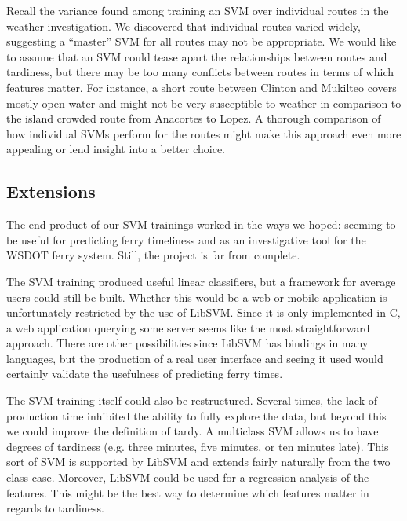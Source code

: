 \documentclass[11pt]{article} %
\begin{document}
Recall the variance found among training an SVM over individual routes in the weather
investigation. We discovered that individual routes varied widely, suggesting a 
``master'' SVM for all routes may not be appropriate. We would like to assume that
an SVM could tease apart the relationships between routes and tardiness, but there
may be too many conflicts between routes in terms of which features matter. For 
instance, a short route between Clinton and Mukilteo covers mostly open water
and might not be very susceptible to weather in comparison to the island crowded
route from Anacortes to Lopez. A thorough comparison of how individual SVMs 
perform for the routes might make this approach even more appealing or lend 
insight into a better choice.


\subsection{Extensions}
\label{sec:extensions}
The end product of our SVM trainings worked in the ways we hoped: seeming to be 
useful for predicting ferry timeliness and as an investigative tool for the
WSDOT ferry system. Still, the project is far from complete. 

The SVM training produced useful linear classifiers, but a framework for average
users could still be built. Whether this would be a web or mobile application is
unfortunately restricted by the use of LibSVM. Since it is only implemented in 
C, a web application querying some server seems like the most straightforward
approach. There are other possibilities since LibSVM has bindings in many languages,
but the production of a real user interface and seeing it used would certainly 
validate the usefulness of predicting ferry times.

The SVM training itself could also be restructured. Several times, the lack of
production time inhibited the ability to fully explore the data, but beyond this
we could improve the definition of tardy. A multiclass SVM allows us to have degrees
of tardiness (e.g. three minutes, five minutes, or ten minutes late). This sort
of SVM is supported by LibSVM and extends fairly naturally from the two class case.
Moreover, LibSVM could be used for a regression analysis of the features. This might
be the best way to determine which features matter in regards to tardiness. 
 
\end{document}
